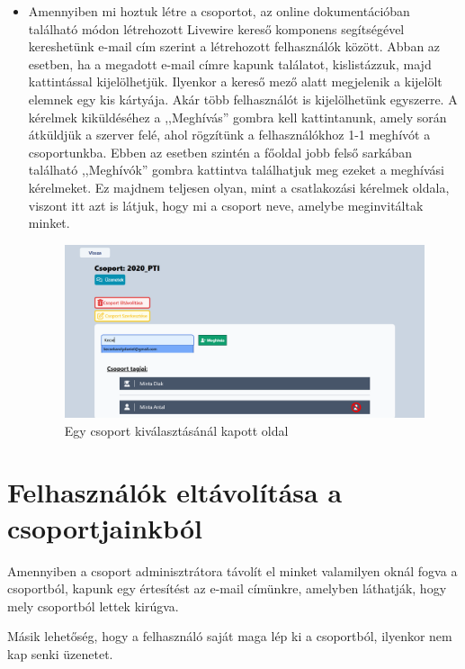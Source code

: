 \documentclass[
]{thesis-ekf}
\theoremstyle{definition}
\theoremstyle{remark}
\begin{document}
\begin{itemize}
                    \item Amennyiben mi hoztuk létre a csoportot, az online dokumentációban\cite{Livewire-Search} található módon létrehozott Livewire kereső komponens segítségével kereshetünk e-mail cím szerint a létrehozott felhasználók között. Abban az esetben, ha a megadott e-mail címre kapunk találatot, kislistázzuk, majd kattintással kijelölhetjük. Ilyenkor a kereső mező alatt megjelenik a kijelölt elemnek egy kis kártyája. Akár több felhasználót is kijelölhetünk egyszerre. A kérelmek kiküldéséhez a ,,Meghívás'' gombra kell kattintanunk, amely során átküldjük a szerver felé, ahol rögzítünk a felhasználókhoz 1-1 meghívót a csoportunkba. Ebben az esetben szintén a főoldal jobb felső sarkában található ,,Meghívók'' gombra kattintva találhatjuk meg ezeket a meghívási kérelmeket. Ez majdnem teljesen olyan, mint a csatlakozási kérelmek oldala, viszont itt azt is látjuk, hogy mi a csoport neve, amelybe meginvitáltak minket.
                    \begin{figure}[ht!]
    		        \centering
    		        \includegraphics[width=15cm]{Groups.show.png}
                        \caption{Egy csoport kiválasztásánál kapott oldal}
    		        \label{fig-csoportok-show}
    	        \end{figure}
                    
                \end{itemize}
            \section{Felhasználók eltávolítása a csoportjainkból}
                Amennyiben a csoport adminisztrátora távolít el minket valamilyen oknál fogva a csoportból, kapunk egy értesítést az e-mail címünkre, amelyben láthatják, hogy mely csoportból lettek kirúgva.

                Másik lehetőség, hogy a felhasználó saját maga lép ki a csoportból, ilyenkor nem kap senki üzenetet.
                
\end{document}
